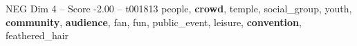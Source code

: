 \begin{textsample}{NEG Dim 4 – Score -2.00 – t001813}  \label{ex:f4_neg_029}
people, \textbf{crowd}, temple, social\_group, youth, \textbf{community}, \textbf{audience}, fan, fun, public\_event, leisure, \textbf{convention}, feathered\_hair

\end{textsample}
